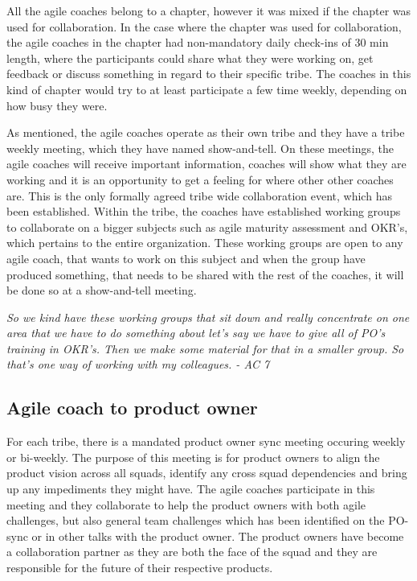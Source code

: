\documentclass[11pt,a4paper]{report}
\begin{document}
All the agile coaches belong to a chapter, however it was mixed if the chapter was used for collaboration. In the case where the chapter was used for collaboration, the agile coaches in the chapter had non-mandatory daily check-ins of 30 min length, where the participants could share what they were working on, get feedback or discuss something in regard to their specific tribe. The coaches in this kind of chapter would try to at least participate a few time weekly, depending on how busy they were. 

As mentioned, the agile coaches operate as their own tribe and they have a tribe weekly meeting, which they have named show-and-tell. On these meetings, the agile coaches will receive important information, coaches will show what they are working and it is an opportunity to get a feeling for where other other coaches are. This is the only formally agreed tribe wide collaboration event, which has been established.
Within the tribe, the coaches have established working groups to collaborate on a bigger subjects such as agile maturity assessment and OKR's, which pertains to the entire organization. These working groups are open to any agile coach, that wants to work on this subject and when the group have produced something, that needs to be shared with the rest of the coaches, it will be done so at a show-and-tell meeting. 

\begin{displayquote}
\textit{
So we kind have these working groups that sit down and really concentrate on one area that we have to do something about let's say we have to give all of PO's training in OKR's. Then we make some material for that in a smaller group. So that's one way of working with my colleagues. - AC 7
}
\end{displayquote}
 
\subsection{Agile coach to product owner}
For each tribe, there is a mandated product owner sync meeting occuring weekly or bi-weekly. The purpose of this meeting is for product owners to align the product vision across all squads, identify any cross squad dependencies and bring up any impediments they might have. The agile coaches participate in this meeting and they collaborate to help the product owners with both agile challenges, but also general team challenges which has been identified on the PO-sync or in other talks with the product owner. The product owners have become a collaboration partner as they are both the face of the squad and they are responsible for the future of their respective products. 
\end{document}
